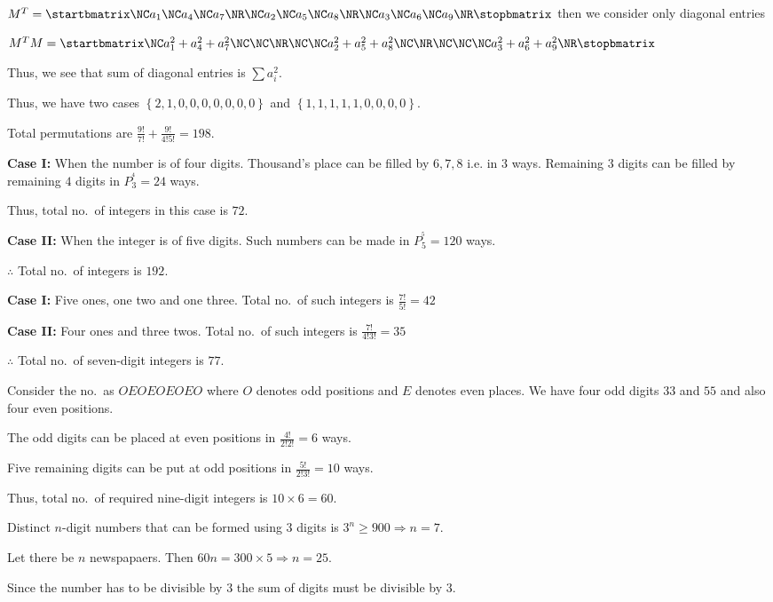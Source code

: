   $M^T = \startbmatrix\NC a_1\NC a_4\NC a_7\NR\NC a_2\NC a_5\NC a_8\NR\NC a_3\NC a_6\NC a_9\NR\stopbmatrix$
  then we consider only diagonal entries

  $M^TM = \startbmatrix\NC a_1^2 + a_4^2 + a_7^2\NC \NC\NR\NC\NC
  a_2^2 + a_5^2 + a_8^2\NC\NR\NC\NC\NC a_3^2 + a_6^2 + a_9^2\NR\stopbmatrix$

  Thus, we see that sum of diagonal entries is $\displaystyle\sum a_i^2$.

  Thus, we have two cases $\left\{2, 1, 0, 0, 0, 0, 0, 0, 0\right\}$ and $\left\{1, 1, 1, 1, 1, 0, 0, 0,
  0\right\}$.

  Total permutations are $\frac{9!}{7!} + \frac{9!}{4!5!} = 198$.
\item {\bf Case I:} When the number is of four digits. Thousand's place can be filled by $6, 7, 8$ i.e. in
  $3$ ways. Remaining $3$ digits can be filled by remaining $4$ digits in $P_3^^4 = 24$ ways.

  Thus, total no.\ of integers in this case is $72$.

  {\bf Case II:} When the integer is of five digits. Such numbers can be made in $P_5^^5 = 120$ ways.

  $\therefore $ Total no.\ of integers is $192$.
\item {\bf Case I:} Five ones, one two and one three. Total no.\ of such integers is $\frac{7!}{5!} = 42$

  {\bf Case II:} Four ones and three twos. Total no.\ of such integers is $\frac{7!}{4!3!} = 35$

  $\therefore $ Total no.\ of seven-digit integers is $77$.
\item Consider the no.\ as $OEOEOEOEO$ where $O$ denotes odd positions and $E$ denotes even places. We have
  four odd digits $33$ and $55$ and also four even positions.

  The odd digits can be placed at even positions in $\frac{4!}{2!2!} = 6$ ways.

  Five remaining digits can be put at odd positions in $\frac{5!}{2!3!} = 10$ ways.

  Thus, total no.\ of required nine-digit integers is $10\times 6 = 60$.
\item Distinct $n$-digit numbers that can be formed using $3$ digits is $3^n\geq 900 \Rightarrow n = 7$.
\item Let there be $n$ newspapaers. Then $60n = 300\times 5 \Rightarrow n = 25$.
\item Since the number has to be divisible by $3$ the sum of digits must be divisible by $3$.

